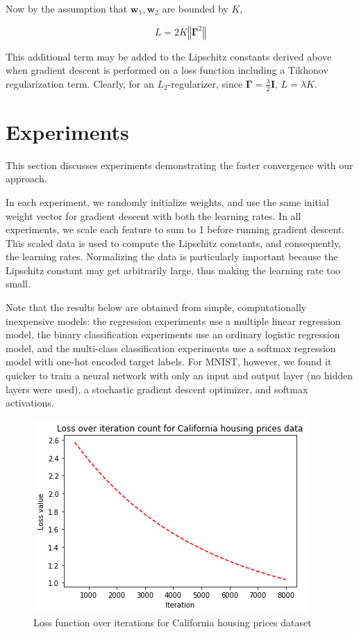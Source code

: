 \documentclass{article}
\begin{document}
Now by the assumption that $\textbf{w}_1, \textbf{w}_2$ are bounded by $K$, 

\[
    \boxed{
        L = 2K \left\Vert \boldsymbol\Gamma^2 \right\Vert
    }
\]

This additional term may be added to the Lipschitz constants derived above when gradient descent is performed on a loss function including a Tikhonov regularization term. Clearly, for an $L_2$-regularizer, since $\boldsymbol\Gamma = \frac{\lambda}{2}\textbf{I}$, $L = \lambda K$.

\section{Experiments}
This section discusses experiments demonstrating the faster convergence with our approach. 

In each experiment, we randomly initialize weights, and use the same initial weight vector for gradient descent with both the learning rates. In all experiments, we scale each feature to sum to 1 before running gradient descent. This scaled data is used to compute the Lipschitz constants, and consequently, the learning rates. Normalizing the data is particularly important because the Lipschitz constant may get arbitrarily large, thus making the learning rate too small.

Note that the results below are obtained from simple, computationally inexpensive models: the regression experiments use a multiple linear regression model, the binary classification experiments use an ordinary logistic regression model, and the multi-class classification experiments use a softmax regression model with one-hot encoded target labels. For MNIST, however, we found it quicker to train a neural network with only an input and output layer (no hidden layers were used), a stochastic gradient descent optimizer, and softmax activations.

\begin{figure}
    \centering
    \includegraphics[scale=0.5]{cali.png}
    \caption{Loss function over iterations for California housing prices dataset}
    \label{fig:leastsq:1}
\end{figure}
\end{document}
